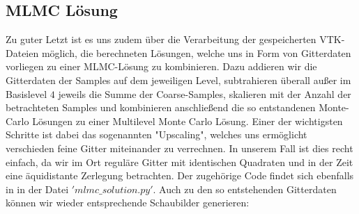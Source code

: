 \subsection{MLMC Lösung}
Zu guter Letzt ist es uns zudem über die Verarbeitung der gespeicherten VTK-Dateien möglich, die berechneten Lösungen, welche uns in Form von Gitterdaten vorliegen zu einer MLMC-Lösung zu kombinieren. Dazu addieren wir die Gitterdaten der Samples auf dem jeweiligen Level, subtrahieren überall außer im Basislevel $ 4 $ jeweils die Summe der Coarse-Samples, skalieren mit der Anzahl der betrachteten Samples und kombinieren anschließend die so entstandenen Monte-Carlo Lösungen zu einer Multilevel Monte Carlo Lösung.
Einer der wichtigsten Schritte ist dabei das sogenannten "Upscaling", welches uns ermöglicht verschieden feine Gitter miteinander zu verrechnen. In unserem Fall ist dies recht einfach, da wir im Ort reguläre Gitter mit identischen Quadraten und in der Zeit eine äquidistante Zerlegung betrachten. Der zugehörige Code findet sich ebenfalls in \cite{githubvtk} in der Datei $'mlmc\_solution.py'$.
Auch zu den so entstehenden Gitterdaten können wir wieder entsprechende Schaubilder generieren:

